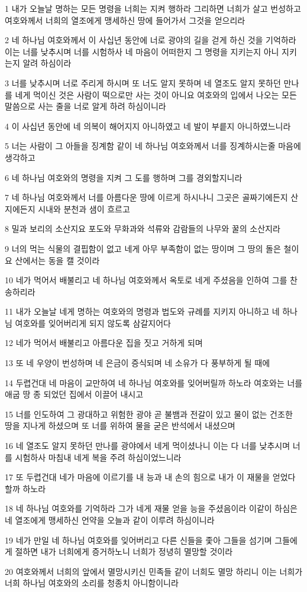 \par 1 내가 오늘날 명하는 모든 명령을 너희는 지켜 행하라 그리하면 너희가 살고 번성하고 여호와께서 너희의 열조에게 맹세하신 땅에 들어가서 그것을 얻으리라
\par 2 네 하나님 여호와께서 이 사십년 동안에 너로 광야의 길을 걷게 하신 것을 기억하라 이는 너를 낮추시며 너를 시험하사 네 마음이 어떠한지 그 명령을 지키는지 아니 지키는지 알려 하심이라
\par 3 너를 낮추시며 너로 주리게 하시며 또 너도 알지 못하며 네 열조도 알지 못하던 만나를 네게 먹이신 것은 사람이 떡으로만 사는 것이 아니요 여호와의 입에서 나오는 모든 말씀으로 사는 줄을 너로 알게 하려 하심이니라
\par 4 이 사십년 동안에 네 의복이 해어지지 아니하였고 네 발이 부릍지 아니하였느니라
\par 5 너는 사람이 그 아들을 징계함 같이 네 하나님 여호와께서 너를 징계하시는줄 마음에 생각하고
\par 6 네 하나님 여호와의 명령을 지켜 그 도를 행하며 그를 경외할지니라
\par 7 네 하나님 여호와께서 너를 아름다운 땅에 이르게 하시나니 그곳은 골짜기에든지 산지에든지 시내와 분천과 샘이 흐르고
\par 8 밀과 보리의 소산지요 포도와 무화과와 석류와 감람들의 나무와 꿀의 소산지라
\par 9 너의 먹는 식물의 결핍함이 없고 네게 아무 부족함이 없는 땅이며 그 땅의 돌은 철이요 산에서는 동을 캘 것이라
\par 10 네가 먹어서 배불리고 네 하나님 여호와께서 옥토로 네게 주셨음을 인하여 그를 찬송하리라
\par 11 내가 오늘날 네게 명하는 여호와의 명령과 법도와 규례를 지키지 아니하고 네 하나님 여호와를 잊어버리게 되지 않도록 삼갈지어다
\par 12 네가 먹어서 배불리고 아름다운 집을 짓고 거하게 되며
\par 13 또 네 우양이 번성하며 네 은금이 증식되며 네 소유가 다 풍부하게 될 때에
\par 14 두렵건대 네 마음이 교만하여 네 하나님 여호와를 잊어버릴까 하노라 여호와는 너를 애굽 땅 종 되었던 집에서 이끌어 내시고
\par 15 너를 인도하여 그 광대하고 위험한 광야 곧 불뱀과 전갈이 있고 물이 없는 건조한 땅을 지나게 하셨으며 또 너를 위하여 물을 굳은 반석에서 내셨으며
\par 16 네 열조도 알지 못하던 만나를 광야에서 네게 먹이셨나니 이는 다 너를 낮추시며 너를 시험하사 마침내 네게 복을 주려 하심이었느니라
\par 17 또 두렵건대 네가 마음에 이르기를 내 능과 내 손의 힘으로 내가 이 재물을 얻었다 할까 하노라
\par 18 네 하나님 여호와를 기억하라 그가 네게 재물 얻을 능을 주셨음이라 이같이 하심은 네 열조에게 맹세하신 언약을 오늘과 같이 이루려 하심이니라
\par 19 네가 만일 네 하나님 여호와를 잊어버리고 다른 신들을 좇아 그들을 섬기며 그들에게 절하면 내가 너희에게 증거하노니 너희가 정녕히 멸망할 것이라
\par 20 여호와께서 너희의 앞에서 멸망시키신 민족들 같이 너희도 멸망 하리니 이는 너희가 너희 하나님 여호와의 소리를 청종치 아니함이니라

